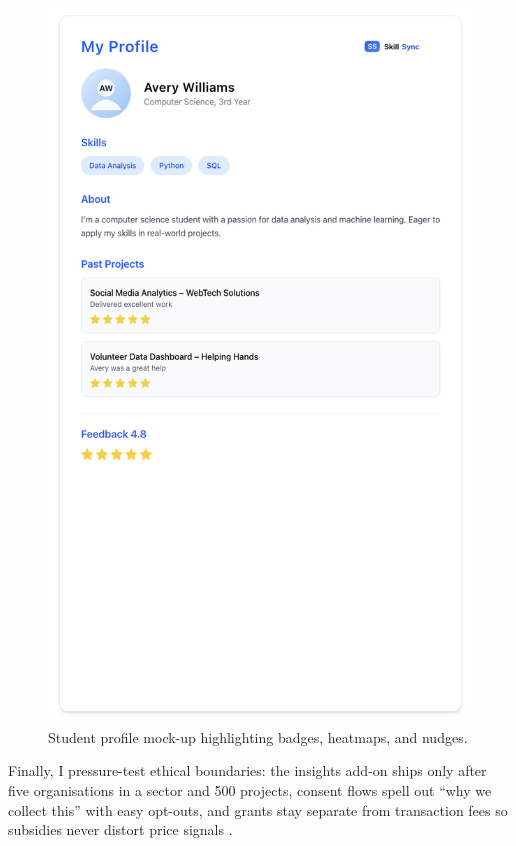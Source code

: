 \begin{figure}[H]
  \centering
  \includegraphics[width=0.8\linewidth]{figures/Student-Profile.png}
  \caption{Student profile mock-up highlighting badges, heatmaps, and nudges.}
  \label{fig:student-profile}
\end{figure}

Finally, I pressure-test ethical boundaries: the insights add-on ships only after five organisations in a sector and 500 projects, consent flows spell out ``why we collect this'' with easy opt-outs, and grants stay separate from transaction fees so subsidies never distort price signals \citep{Zuboff2019,Srnicek2017}.

